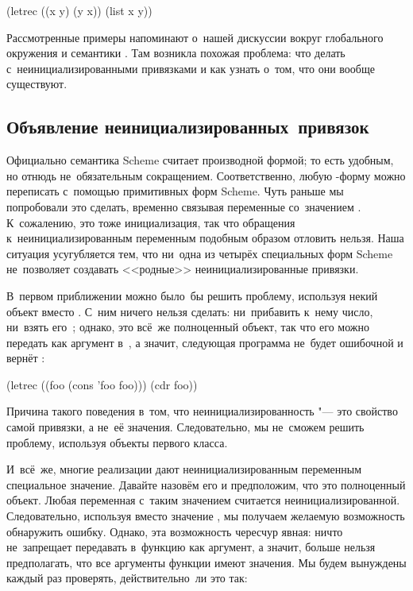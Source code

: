 \begin{code:lisp}
(letrec ((x y) (y x)) (list x y))
\end{code:lisp}

Рассмотренные примеры напоминают о~нашей дискуссии вокруг глобального окружения
и семантики . Там возникла похожая проблема: что делать
с~неинициализированными привязками и как узнать о~том, что они вообще
существуют.


\subsection{Объявление неинициализированных~привязок}%
\label{lisp1-2-omega/recusion/ssect:uninitialized}

Официально семантика Scheme считает  производной формой; то есть
удобным, но отнюдь не~обязательным сокращением. Соответственно, любую
-форму можно переписать с~помощью примитивных форм Scheme. Чуть
раньше мы попробовали это сделать, временно связывая переменные 
со~значением . К~сожалению, это тоже инициализация, так что обращения
к~неинициализированным переменным подобным образом отловить нельзя. Наша
ситуация усугубляется тем, что ни~одна из четырёх специальных форм Scheme
не~позволяет создавать <<родные>> неинициализированные привязки.

В~первом приближении можно было~бы решить проблему, используя некий объект
  вместо . С~ним ничего нельзя
сделать: ни~прибавить к~нему число, ни~взять его~; однако, это всё~же
полноценный объект, так что его можно передать как аргумент в~, а
значит, следующая программа не~будет ошибочной и вернёт :

\begin{code:lisp}
(letrec ((foo (cons 'foo foo))) (cdr foo))
\end{code:lisp}

Причина такого поведения в~том, что неинициализированность "--- это свойство
самой привязки, а не~её значения. Следовательно, мы не~сможем решить проблему,
используя объекты первого класса.


И~всё~же, многие реализации дают неинициализированным переменным специальное
значение. Давайте назовём его  и предположим, что это
полноценный объект. Любая переменная с~таким значением считается
неинициализированной. Следовательно, используя вместо  значение
, мы получаем желаемую возможность обнаружить ошибку.
Однако, эта возможность чересчур явная: ничто не~запрещает передавать
 в~функцию как аргумент, а значит, больше нельзя
предполагать, что все аргументы функции имеют значения. Мы будем вынуждены
каждый раз проверять, действительно~ли это так:

